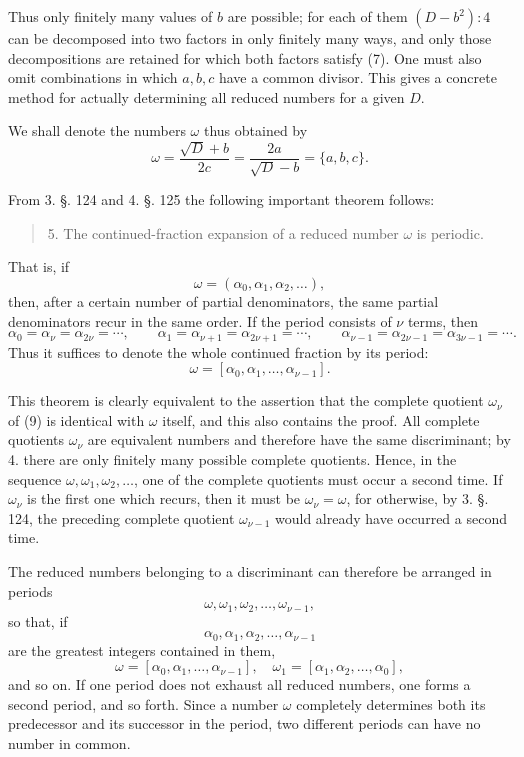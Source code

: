 \documentclass[11pt]{article}
\begin{document}
Thus only finitely many values of $b$ are possible; for each of them $(D-b^2):4$ can be decomposed into two factors in only finitely many ways, and only those decompositions are retained for which both factors satisfy (7). One must also omit combinations in which $a,b,c$ have a common divisor. This gives a concrete method for actually determining all reduced numbers for a given $D$.

We shall denote the numbers $\omega$ thus obtained by
\[
\tag{8}        \omega=\frac{\sqrt D+b}{2c}
=\frac{2a}{\sqrt D-b}=\{a,b,c\}.
\]

From 3. §. 124 and 4. §. 125 the following important theorem follows:
\begin{quote}
5. The continued-fraction expansion of a reduced number $\omega$ is periodic.
\end{quote}
That is, if
\[
\tag{9}        \omega=(\alpha_0,\alpha_1,\alpha_2,\ldots),
\]
then, after a certain number of partial denominators, the same partial denominators recur in the same order. If the period consists of $\nu$ terms, then
\[
\alpha_0=\alpha_\nu=\alpha_{2\nu}=\cdots,\qquad
\alpha_1=\alpha_{\nu+1}=\alpha_{2\nu+1}=\cdots,\qquad
\alpha_{\nu-1}=\alpha_{2\nu-1}=\alpha_{3\nu-1}=\cdots.
\]
Thus it suffices to denote the whole continued fraction by its period:
\[
\tag{10}       \omega=[\alpha_0,\alpha_1,\ldots,\alpha_{\nu-1}].
\]

This theorem is clearly equivalent to the assertion that the complete quotient $\omega_\nu$ of (9) is identical with $\omega$ itself, and this also contains the proof. All complete quotients $\omega_\nu$ are equivalent numbers and therefore have the same discriminant; by 4. there are only finitely many possible complete quotients. Hence, in the sequence $\omega,\omega_1,\omega_2,\ldots$, one of the complete quotients must occur a second time. If $\omega_\nu$ is the first one which recurs, then it must be $\omega_\nu=\omega$, for otherwise, by 3. §. 124, the preceding complete quotient $\omega_{\nu-1}$ would already have occurred a second time.

The reduced numbers belonging to a discriminant can therefore be arranged in periods
\[
\tag{11}       \omega,\omega_1,\omega_2,\ldots,\omega_{\nu-1},
\]
so that, if
\[
        \alpha_0,\alpha_1,\alpha_2,\ldots,\alpha_{\nu-1}
\]
are the greatest integers contained in them,
\[
        \omega=[\alpha_0,\alpha_1,\ldots,\alpha_{\nu-1}],\quad
        \omega_1=[\alpha_1,\alpha_2,\ldots,\alpha_0],
\]
and so on. If one period does not exhaust all reduced numbers, one forms a second period, and so forth. Since a number $\omega$ completely determines both its predecessor and its successor in the period, two different periods can have no number in common.
\end{document}
